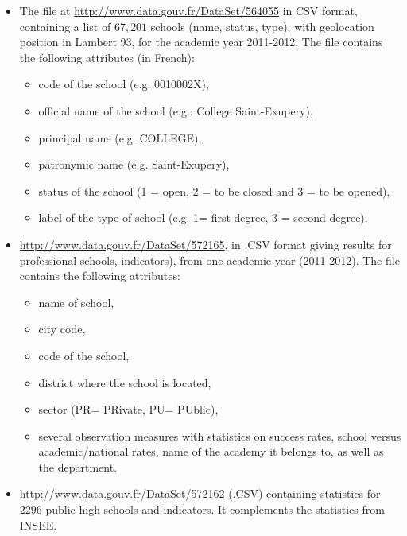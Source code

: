 \begin{itemize}
\item The file at \url{http://www.data.gouv.fr/DataSet/564055} in CSV format, containing a list of $67, 201$ schools (name, status, type), with geolocation position in Lambert 93, for the academic year 2011-2012. The file contains the following attributes (in French): 
	\begin{itemize}
		\item code of the school (e.g. 0010002X), 
		\item  official name of the school (e.g.: College Saint-Exupery), 
		\item principal name (e.g. COLLEGE), 
		\item patronymic name (e.g. Saint-Exupery), 
		\item status of the school (1 = open, 2 = to be closed and 3 = to be opened), 
		\item label of the type of school (e.g: 1= first degree, 3 = second degree).
	\end{itemize}
\item \url{http://www.data.gouv.fr/DataSet/572165}, in .CSV format giving results for professional schools, indicators), from one academic year (2011-2012). The file contains the following attributes:
	\begin{itemize}
		\item name of school, 
		\item  city code, 
		\item code of the school, 
		\item district where the school is located, 
		\item sector (PR= PRivate, PU= PUblic), 
		\item several observation measures with statistics on success rates, school versus academic/national rates, name of the academy it belongs to, as well as the department.
	\end{itemize}
   \item \url{http://www.data.gouv.fr/DataSet/572162} (.CSV) containing statistics for  $2296$ public high schools and indicators. It complements the statistics from INSEE.
\end{itemize}

